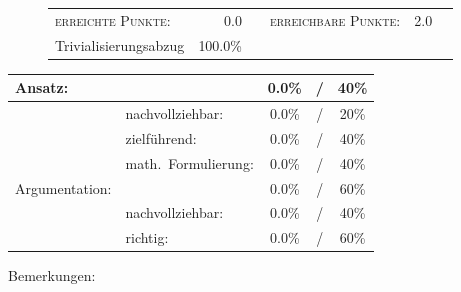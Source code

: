 \documentclass{article}
\begin{document}
\vspace{-0.5cm}
\begin{figure}[h!]
\begin{tabular}{lrcrcr}
\textsc{erreichte Punkte:} &0.0& & \textsc{erreichbare Punkte:} &2.0\\
\small Trivialisierungsabzug  & 100.0\% & & &
\end{tabular}
\end{figure}
\vspace{-0.1cm}
\begin{minipage}[t]{0.6\textwidth}
\flushleft
\begin{tabular}{l|lccc}
Ansatz:& &0.0\%&/&40\%\\\hline
&nachvollziehbar:&0.0\%&/&20\%\\
&zielf{\"u}hrend:&0.0\%&/&40\%\\
&math.~Formulierung:& 0.0\%&/&40\%\\\hline\hline
Argumentation:& &0.0\%&/&60\%\\\hline
&nachvollziehbar:&0.0\%&/&40\%\\
&richtig:&0.0\%&/&60\%\\\hline
\end{tabular}
\end{minipage}
\hfill
\begin{minipage}[t]{0.4\textwidth}
	\vspace{-1.75cm}
	Bemerkungen:\\\vspace*{0.2cm}
	\underline{\hspace{0.95\textwidth}}\\\vspace*{0.2cm}
	\underline{\hspace{0.95\textwidth}}
	\\\vspace*{0.2cm}
	\underline{\hspace{0.95\textwidth}}
	\\\vspace*{0.2cm}
	\underline{\hspace{0.95\textwidth}}
	\\\vspace*{0.2cm}
	\underline{\hspace{0.95\textwidth}}
\end{minipage}
	\vspace{0.5cm}\clearpage
\end{document}
